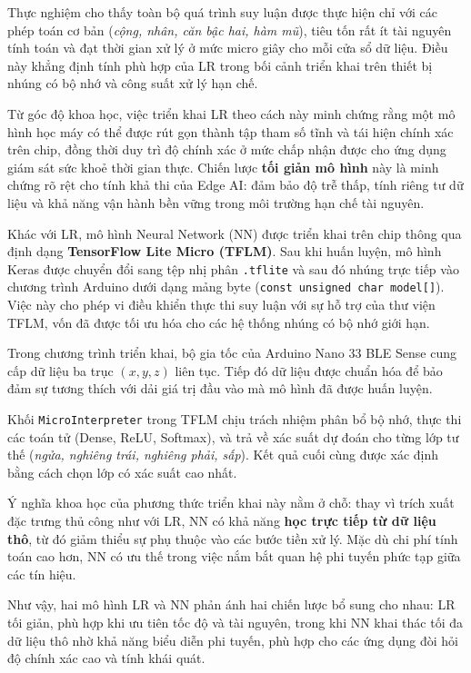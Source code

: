 Thực nghiệm cho thấy toàn bộ quá trình suy luận được thực hiện chỉ với các phép toán cơ bản 
(\emph{cộng, nhân, căn bậc hai, hàm mũ}), tiêu tốn rất ít tài nguyên tính toán 
và đạt thời gian xử lý ở mức micro giây cho mỗi cửa sổ dữ liệu. 
Điều này khẳng định tính phù hợp của LR trong bối cảnh triển khai trên thiết bị nhúng 
có bộ nhớ và công suất xử lý hạn chế.  

Từ góc độ khoa học, việc triển khai LR theo cách này minh chứng rằng một mô hình học máy 
có thể được rút gọn thành tập tham số tĩnh và tái hiện chính xác trên chip, 
đồng thời duy trì độ chính xác ở mức chấp nhận được cho ứng dụng giám sát sức khoẻ thời gian thực. 
Chiến lược \textbf{tối giản mô hình} này là minh chứng rõ rệt cho tính khả thi của Edge AI: 
đảm bảo độ trễ thấp, tính riêng tư dữ liệu và khả năng vận hành bền vững trong môi trường hạn chế tài nguyên.

Khác với LR, mô hình Neural Network (NN) được triển khai trên chip thông qua định dạng 
\textbf{TensorFlow Lite Micro (TFLM)}. Sau khi huấn luyện, mô hình Keras được chuyển đổi sang 
tệp nhị phân \texttt{.tflite} và sau đó nhúng trực tiếp vào chương trình Arduino dưới dạng mảng byte 
(\texttt{const unsigned char model[]}). Việc này cho phép vi điều khiển thực thi suy luận với sự hỗ trợ 
của thư viện TFLM, vốn đã được tối ưu hóa cho các hệ thống nhúng có bộ nhớ giới hạn.  

Trong chương trình triển khai, bộ gia tốc của Arduino Nano 33 BLE Sense 
cung cấp dữ liệu ba trục $(x, y, z)$ liên tục. Tiếp đó dữ liệu được chuẩn hóa để bảo đảm sự tương thích với dải giá trị đầu vào mà mô hình đã được huấn luyện.  

Khối \texttt{MicroInterpreter} trong TFLM chịu trách nhiệm phân bổ bộ nhớ, 
thực thi các toán tử (Dense, ReLU, Softmax), và trả về xác suất dự đoán cho từng lớp tư thế 
(\emph{ngửa, nghiêng trái, nghiêng phải, sấp}). Kết quả cuối cùng được xác định bằng cách 
chọn lớp có xác suất cao nhất.  

Ý nghĩa khoa học của phương thức triển khai này nằm ở chỗ: 
thay vì trích xuất đặc trưng thủ công như với LR, NN có khả năng \textbf{học trực tiếp từ dữ liệu thô}, 
từ đó giảm thiểu sự phụ thuộc vào các bước tiền xử lý. 
Mặc dù chi phí tính toán cao hơn, 
NN có ưu thế trong việc nắm bắt quan hệ phi tuyến 
phức tạp giữa các tín hiệu.  

Như vậy, hai mô hình LR và NN phản ánh hai chiến lược bổ sung cho nhau: 
LR tối giản, phù hợp khi ưu tiên tốc độ và tài nguyên, trong khi NN khai thác tối đa dữ liệu thô 
nhờ khả năng biểu diễn phi tuyến, phù hợp cho các ứng dụng đòi hỏi độ chính xác cao và tính khái quát.  

